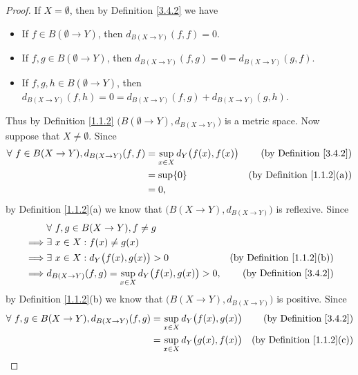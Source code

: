 \begin{proof}
    If \(X = \emptyset\), then by Definition \ref{3.4.2} we have
    \begin{itemize}
        \item If \(f \in B(\emptyset \to Y)\), then \(d_{B(X \to Y)}(f, f) = 0\).
        \item If \(f, g \in B(\emptyset \to Y)\), then \(d_{B(X \to Y)}(f, g) = 0 = d_{B(X \to Y)}(g, f)\).
        \item If \(f, g, h \in B(\emptyset \to Y)\), then \(d_{B(X \to Y)}(f, h) = 0 = d_{B(X \to Y)}(f, g) + d_{B(X \to Y)}(g, h)\).
    \end{itemize}
    Thus by Definition \ref{1.1.2} \(\big(B(\emptyset \to Y), d_{B(X \to Y)}\big)\) is a metric space.
    Now suppose that \(X \neq \emptyset\).
    Since
    \begin{align*}
        \forall\ f \in B(X \to Y), d_{B(X \to Y)}(f, f) & = \sup_{x \in X} d_Y\big(f(x), f(x)\big) & \text{(by Definition \ref{3.4.2})}    \\
                                                        & = \sup \{0\}                             & \text{(by Definition \ref{1.1.2}(a))} \\
                                                        & = 0,
    \end{align*}
    by Definition \ref{1.1.2}(a) we know that \(\big(B(X \to Y), d_{B(X \to Y)}\big)\) is reflexive.
    Since
    \begin{align*}
                 & \forall\ f, g \in B(X \to Y), f \neq g                                                                     \\
        \implies & \exists\ x \in X : f(x) \neq g(x)                                                                          \\
        \implies & \exists\ x \in X : d_Y\big(f(x), g(x)\big) > 0                     & \text{(by Definition \ref{1.1.2}(b))} \\
        \implies & d_{B(X \to Y)}(f, g) = \sup_{x \in X} d_Y\big(f(x), g(x)\big) > 0, & \text{(by Definition \ref{3.4.2})}
    \end{align*}
    by Definition \ref{1.1.2}(b) we know that \(\big(B(X \to Y), d_{B(X \to Y)}\big)\) is positive.
    Since
    \begin{align*}
        \forall\ f, g \in B(X \to Y), d_{B(X \to Y)}(f, g) & = \sup_{x \in X} d_Y\big(f(x), g(x)\big) & \text{(by Definition \ref{3.4.2})}    \\
                                                           & = \sup_{x \in X} d_Y\big(g(x), f(x)\big) & \text{(by Definition \ref{1.1.2}(c))} \\

\end{align*}
\end{proof}
